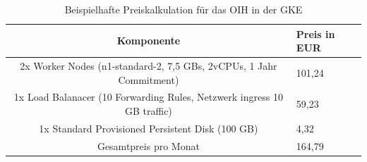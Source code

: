 \begin{table}[h!]
\begin{tabular}{|c|p{3cm} |}
\hline
\textbf{Komponente} & \textbf{Preis in EUR}\\ \hline \bottomrule
2x Worker Nodes (n1-standard-2, 7,5 GBs, 2vCPUs, 1 Jahr Commitment) & 101,24 \\ \hline
1x Load Balanacer (10 Forwarding Rules, Netzwerk ingress 10 GB traffic) & 59,23 \\ \hline
1x Standard Provisioned Persistent Disk (100 GB) & 4,32 \\ \hline
Gesamtpreis pro Monat & 164,79 \\ \hline
\end{tabular}
\caption{Beispielhafte Preiskalkulation für das OIH in der GKE}
\label{tab:Beispielhafte Preiskalkulation für das OIH in der GKE}
\end{table}